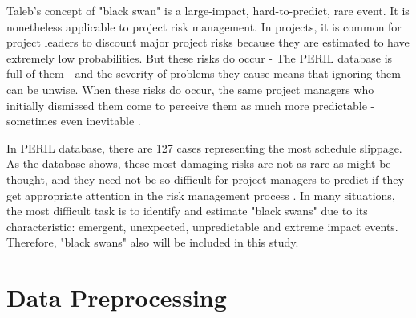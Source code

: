Taleb's concept of "black swan" is a large-impact, hard-to-predict, rare event. It is nonetheless applicable to project risk management. In projects, it is common for project leaders to discount major project risks because they are estimated to have extremely low probabilities. But these risks do occur - The PERIL database is full of them - and the severity of problems they cause means that ignoring them can be unwise. When these risks do occur, the same project managers who initially dismissed them come to perceive them as much more predictable - sometimes even inevitable \cite{KEND2003BOOK}.

In PERIL database, there are 127 cases representing the most schedule slippage. As the database shows, these most damaging risks are not as rare as might be thought, and they need not be so difficult for project managers to predict if they get appropriate attention in the risk management process \cite{KEND2003BOOK}. In many situations, the most difficult task is to identify and estimate "black swans" due to its characteristic: emergent, unexpected, unpredictable and extreme impact events. Therefore, "black swans" also will be included in this study.

\section{Data Preprocessing}
\label{sec:datapreprocessing}


